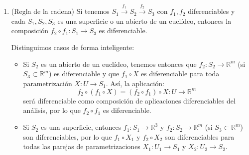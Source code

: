 \begin{ejercicio}
\begin{enumerate}
        \item (Regla de la cadena) Si tenemos $S_1 \stackrel{f_1}{\longrightarrow} S_2 \stackrel{f_2}{\longrightarrow}S_3$ con $f_1,f_2$ diferenciables y cada $S_1,S_2,S_3$ es una superficie o un abierto de un euclídeo, entonces la composición $f_2\circ f_1:S_1\to S_3$ es diferenciable.

            Distinguimos casos de forma inteligente:
            \begin{itemize}
                \item Si $S_2$ es un abierto de un euclídeo, tenemos entonces que $f_2:S_2\to\mathbb{R}^m$ (si $S_3\subset\mathbb{R}^m$) es diferenciable y que $f_1\circ X$ es diferenciable para toda parametrización $X:U\to S_1$. Así, la aplicación:
                    \begin{equation*}
                        f_2\circ (f_1\circ X) = (f_2\circ f_1)\circ X:U\to \mathbb{R}^m
                    \end{equation*}
                    será diferenciable como composición de aplicaciones diferenciables del análisis, por lo que $f_2\circ f_1$ es diferenciable.
                \item Si $S_2$ es una superficie, entonces $f_1:S_1\to \mathbb{R}^3$ y $f_2:S_2\to\mathbb{R}^m$ (si $S_3\subset\mathbb{R}^m$) son diferenciables, por lo que $f_1\circ X_1$ y $f_2\circ X_2$ son diferenciables para todas las parejas de parametrizaciones $X_1:U_1\to S_1$ y $X_2:U_2\to S_2$.


\end{itemize}
\end{enumerate}
\end{ejercicio}
